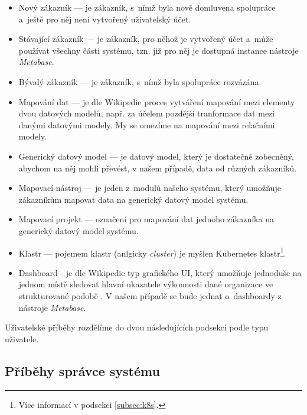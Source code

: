 \begin{itemize}
    \item Nový zákazník — je zákazník, s~nímž byla nově domluvena spolupráce a~ještě pro něj není vytvořený uživatelský účet.
    \item Stávající zákazník — je zákazník, pro něhož je vytvořený účet a~může používat všechny části systému, tzn. již pro něj je dostupná instance nástroje \textit{Metabase}. 
    \item Bývalý zákazník — je zákazník, s~nímž byla spolupráce rozvázána.
    \item Mapování dat — je dle Wikipedie proces vytváření mapování mezi elementy dvou datových modelů, např. za účelem pozdější tranformace dat mezi danými datovými modely\cite{dataMapping:online}.
    My se omezíme na mapování mezi relačními modely.
    
    \item Generický datový model — je datový model, který je dostatečně zobecněný, abychom na něj mohli převést, v našem případě, data od různých zákazníků.
    \item Mapovací nástroj — je jeden z~modulů našeho systému, který umožňuje zákazníkům mapovat data na generický datový model systému.
    \item Mapovací projekt — označení pro mapování dat jednoho zákazníka na generický datový model systému.
    \item Klastr — pojemem klastr (anlgicky \textit{cluster}) je myšlen Kubernetes klastr\footnote{Více informací v podsekci \ref{subsec:k8s}.}.
    \item Dashboard - je dle Wikipedie typ grafického UI, který umožňuje jednoduše na jednom místě sledovat hlavní ukazatele výkonnosti\footnotemark{} dané organizace ve strukturované podobě \cite{Dashboards:online}.
    V našem případě se bude jednat o~dashboardy z nástroje \textit{Metabase}.
\end{itemize}

Uživatelské příběhy rozdělíme do dvou následujících podsekcí podle typu uživatele.



\subsection{Příběhy správce systému}

